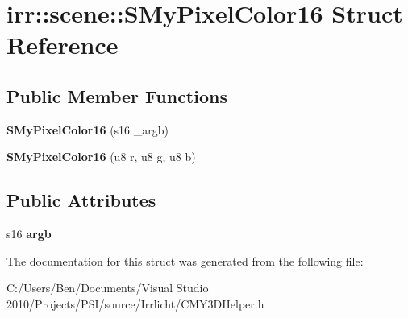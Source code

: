 \hypertarget{structirr_1_1scene_1_1_s_my_pixel_color16}{\section{irr\-:\-:scene\-:\-:S\-My\-Pixel\-Color16 Struct Reference}
\label{structirr_1_1scene_1_1_s_my_pixel_color16}
}
\subsection*{Public Member Functions}
\begin{DoxyCompactItemize}
\item 
\hypertarget{structirr_1_1scene_1_1_s_my_pixel_color16_a018aad51bfc3b89899fccf4fbac80d70}{{\bfseries S\-My\-Pixel\-Color16} (s16 \-\_\-argb)}\label{structirr_1_1scene_1_1_s_my_pixel_color16_a018aad51bfc3b89899fccf4fbac80d70}

\item 
\hypertarget{structirr_1_1scene_1_1_s_my_pixel_color16_a7808e5a075f14ec12bd5688dc40d86b3}{{\bfseries S\-My\-Pixel\-Color16} (u8 r, u8 g, u8 b)}\label{structirr_1_1scene_1_1_s_my_pixel_color16_a7808e5a075f14ec12bd5688dc40d86b3}

\end{DoxyCompactItemize}
\subsection*{Public Attributes}
\begin{DoxyCompactItemize}
\item 
\hypertarget{structirr_1_1scene_1_1_s_my_pixel_color16_abf15f2cc06a54973cc5470e498162c34}{s16 {\bfseries argb}}\label{structirr_1_1scene_1_1_s_my_pixel_color16_abf15f2cc06a54973cc5470e498162c34}

\end{DoxyCompactItemize}


The documentation for this struct was generated from the following file\-:\begin{DoxyCompactItemize}
\item 
C\-:/\-Users/\-Ben/\-Documents/\-Visual Studio 2010/\-Projects/\-P\-S\-I/source/\-Irrlicht/C\-M\-Y3\-D\-Helper.\-h\end{DoxyCompactItemize}
